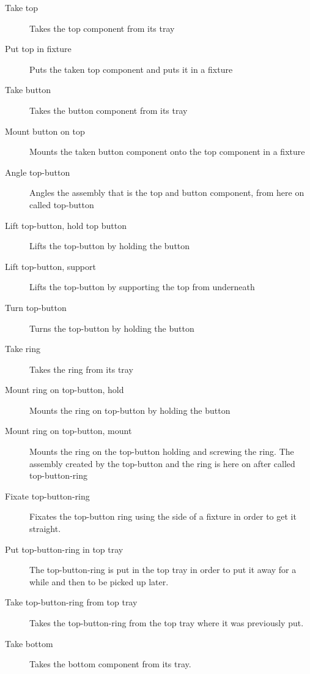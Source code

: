 \begin{description}
\item[Take top] Takes the top component from its tray

\item[Put top in fixture] Puts the taken top component and puts it in a fixture

\item[Take button] Takes the button component from its tray

\item[Mount button on top] Mounts the taken button component onto the top component in a fixture

\item[Angle top-button] Angles the assembly that is the top and button component, from here on called top-button

\item[Lift top-button, hold top button] Lifts the top-button by holding the button

\item[Lift top-button, support] Lifts the top-button by supporting the top from underneath

\item[Turn top-button] Turns the top-button by holding the button

\item[Take ring] Takes the ring from its tray

\item[Mount ring on top-button, hold] Mounts the ring on top-button by holding the button

\item[Mount ring on top-button, mount] Mounts the ring on the top-button holding and screwing the ring. The assembly created by the top-button and the ring is here on after called top-button-ring

\item[Fixate top-button-ring] Fixates the top-button ring using the side of a fixture in order to get it straight.

\item[Put top-button-ring in top tray] The top-button-ring is put in the top tray in order to put it away for a while and then to be picked up later.

\item[Take top-button-ring from top tray] Takes the top-button-ring from the top tray where it was previously put.

\item[Take bottom] Takes the bottom component from its tray.


\end{description}
